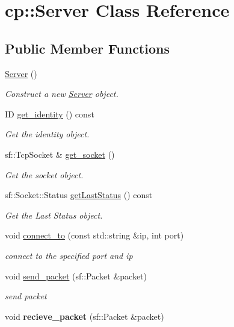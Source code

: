 \hypertarget{classcp_1_1_server}{}\section{cp\+:\+:Server Class Reference}
\label{classcp_1_1_server}
\subsection*{Public Member Functions}
\begin{DoxyCompactItemize}
\item 
\mbox{\label{classcp_1_1_server_a01d0cc0ae7adc7594399753f98e90fbc}} 
\hyperlink{classcp_1_1_server_a01d0cc0ae7adc7594399753f98e90fbc}{Server} ()
\begin{DoxyCompactList}\small\item\em Construct a new \hyperlink{classcp_1_1_server}{Server} object. \end{DoxyCompactList}\item 
ID \hyperlink{classcp_1_1_server_a9a492566ee0efac90c49dec317876311}{get\+\_\+identity} () const
\begin{DoxyCompactList}\small\item\em Get the identity object. \end{DoxyCompactList}\item 
sf\+::\+Tcp\+Socket \& \hyperlink{classcp_1_1_server_aa55a5008f274c0ffd2afa632ec857df7}{get\+\_\+socket} ()
\begin{DoxyCompactList}\small\item\em Get the socket object. \end{DoxyCompactList}\item 
sf\+::\+Socket\+::\+Status \hyperlink{classcp_1_1_server_ae880b305b96776c6c6d38b29a4d3007b}{get\+Last\+Status} () const
\begin{DoxyCompactList}\small\item\em Get the Last Status object. \end{DoxyCompactList}\item 
void \hyperlink{classcp_1_1_server_ae83a84ed4d85c6e432d09013a48392c8}{connect\+\_\+to} (const std\+::string \&ip, int port)
\begin{DoxyCompactList}\small\item\em connect to the specified port and ip \end{DoxyCompactList}\item 
void \hyperlink{classcp_1_1_server_abe6024ffde0c27bb4c1c7a14c206df5a}{send\+\_\+packet} (sf\+::\+Packet \&packet)
\begin{DoxyCompactList}\small\item\em send packet \end{DoxyCompactList}\item 
\mbox{\label{classcp_1_1_server_ac815dc5a236bbe5036e139e50c1e8fb4}} 
void {\bfseries recieve\+\_\+packet} (sf\+::\+Packet \&packet)
\end{DoxyCompactItemize}
